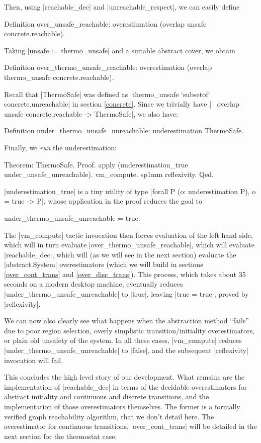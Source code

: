 \documentclass[runningheads]{llncs}
\begin{document}
Then, using |reachable_dec| and |unreachable_respect|, we can easily define
\begin{code}
  Definition over_unsafe_reachable: overestimation (overlap unsafe concrete.reachable).
\end{code}
Taking |unsafe := thermo_unsafe| and a suitable abstract cover, we obtain
\begin{code}
  Definition over_thermo_unsafe_reachable:
    overestimation (overlap thermo_unsafe concrete.reachable).
\end{code}
Recall that |ThermoSafe| was defined as |thermo_unsafe `subsetof` concrete.unreachable| in section \ref{concrete}. Since we trivially have |~ overlap unsafe concrete.reachable -> ThermoSafe|, we also have:
\begin{code}
Definition under_thermo_unsafe_unreachable: underestimation ThermoSafe.
\end{code}
Finally, we \emph{run} the underestimation:
\begin{code}
Theorem: ThermoSafe.
Proof.
  apply (underestimation_true under_unsafe_unreachable).
  vm_compute. sp1mm reflexivity.
Qed.
\end{code}
|underestimation_true| is a tiny utility of type |forall P (o: underestimation P), o = true -> P|, whose application in the proof reduces the goal to
\begin{code}under_thermo_unsafe_unreachable = true.\end{code} The |vm_compute| tactic invocation then forces evaluation of the left hand side, which will in turn evaluate |over_thermo_unsafe_reachable|, which will evaluate |reachable_dec|, which will (as we will see in the next section) evaluate the |abstract.System| overestimators (which we will build in sections \ref{over_cont_trans} and \ref{over_disc_trans}). This process, which takes about 35 seconds on a modern desktop machine, eventually reduces |under_thermo_unsafe_unreachable| to |true|, leaving |true = true|, proved by |reflexivity|.

We can now also clearly see what happens when the abstraction method ``fails'' due to poor region selection, overly simplistic transition/initiality overestimators, or plain old unsafety of the system. In all these cases, |vm_compute| reduces |under_thermo_unsafe_unreachable| to |false|, and the subsequent |reflexivity| invocation will fail.

This concludes the high level story of our development. What remains
are the implementation of |reachable_dec| in terms of the decidable
overestimators for abstract initiality and continuous and discrete
transitions, and the implementation of those overestimators
themselves. The former is a formally verified graph reachability
algorithm, that we don't detail here. The overestimator for continuous
transitions, |over_cont_trans| will be detailed in the next section
for the thermostat case.
\end{document}
